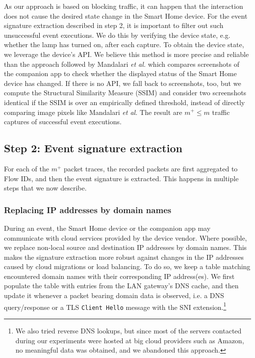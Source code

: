 As our approach is based on blocking traffic, it can happen that the interaction does not cause the desired state change in the Smart Home device. For the event signature extraction described in step 2, it is important to filter out such unsuccessful event executions. We do this by verifying the device state, e.g. whether the lamp has turned on, after each capture. To obtain the device state, we leverage the device's API. We believe this method is more precise and reliable than the approach followed by Mandalari \textit{et al.} \cite{blocking-without-breaking} which compares screenshots of the companion app to check whether the displayed status of the Smart Home device has changed. If there is no API, we fall back to screenshots, too, but we compute the Structural Similarity Measure (SSIM) \cite{ssim} and consider two screenshots identical if the SSIM is over an empirically defined threshold, instead of directly comparing image pixels like Mandalari \textit{et al.} The result are $m^+ \leq m$ traffic captures of successful event executions.


\subsection{Step 2: Event signature extraction}
\label{sec:sig-ex}

For each of the $m^+$ packet traces, the recorded packets are first aggregated to Flow IDs, and then the event signature is extracted. This happens in multiple steps that we now describe.

\subsubsection{Replacing IP addresses by domain names}

During an event, the Smart Home device or the companion app may communicate with cloud services provided by the device vendor.
Where possible, we replace non-local source and destination IP addresses by domain names. This makes the signature extraction more robust against changes in the IP addresses caused by cloud migrations or load balancing. To do so, we keep a table matching encountered domain names with their corresponding IP address(es). We first populate the table with entries from the LAN gateway's DNS cache, and then update it whenever a packet bearing domain data is observed, i.e. a DNS query/response or a TLS \texttt{Client Hello} message with the SNI extension.\footnote{We also tried reverse DNS lookups, but since most of the servers contacted during our experiments were hosted at big cloud providers such as Amazon, no meaningful data was obtained, and we abandoned this approach.}


